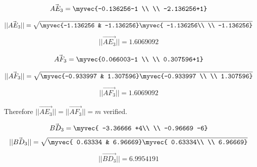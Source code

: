 \documentclass[journal,12pt,twocolumn]{IEEEtran}
\theoremstyle{remark}
\begin{document}
\begin{align}
        \vec{AE_3}=\myvec{-0.136256-1 \\ \\
       -2.136256+1}
\end{align}

\begin{align}
        ||\vec{AE_3}||=\sqrt{\myvec{-1.136256 &
       -1.136256}
       \myvec{ -1.136256\\ \\
       -1.136256}} 
\end{align}
\begin{align}
        ||\vec{AE_3}||= 1.6069092 
\end{align}




\begin{align}
	\vec{AF_3}=\myvec{0.066003-1 \\ \\
       0.307596+1}
\end{align}

\begin{align}
	||\vec{AF_3}||=\sqrt{\myvec{-0.933997 &
       1.307596}
       \myvec{-0.933997 \\ \\
       1.307596}} 
\end{align}
\begin{align}
	||\vec{AF_3}||=1.6069092
\end{align}


\begin{flushleft}
	Therefore $||\vec{AE_3}||= ||\vec{AF_3}||=m $ verified.
\end{flushleft}




\begin{align}
        \vec{BD_3}=\myvec{ -3.36666 +4\\ \\
                -0.96669 -6}
\end{align}
\begin{align}
        ||\vec{BD_3}||=\sqrt{\myvec{ 0.63334  &
       6.96669}
       \myvec{ 0.63334\\ \\
       6.96669}} 
\end{align}
\begin{align}
        ||\vec{BD_3}||=6.9954191 
\end{align}
\end{document}
